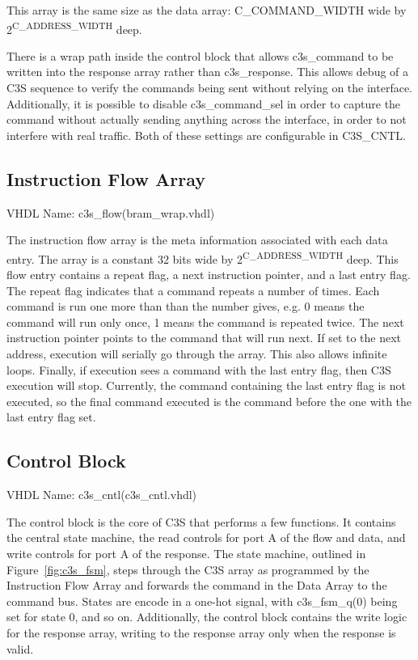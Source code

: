 This array is the same size as the data array: C\_COMMAND\_WIDTH wide
by 2\textsuperscript{C\_ADDRESS\_WIDTH} deep.

There is a wrap path inside the control block that allows c3s\_command
to be written into the response array rather than c3s\_response. This
allows debug of a C3S sequence to verify the commands being sent
without relying on the interface. Additionally, it is possible to
disable c3s\_command\_sel in order to capture the command without
actually sending anything across the interface, in order to not
interfere with real traffic. Both of these settings are configurable
in C3S\_CNTL.

\subsection{Instruction Flow Array}
VHDL Name: c3s\_flow(bram\_wrap.vhdl)

The instruction flow array is the meta information associated with
each data entry. The array is a constant 32 bits wide by
2\textsuperscript{C\_ADDRESS\_WIDTH} deep. This flow entry contains a
repeat flag, a next instruction pointer, and a last entry flag. The
repeat flag indicates that a command repeats a number of times. Each
command is run one more than than the number gives, e.g. 0 means the
command will run only once, 1 means the command is repeated twice. The
next instruction pointer points to the command that will run next. If
set to the next address, execution will serially go through the
array. This also allows infinite loops. Finally, if execution sees a
command with the last entry flag, then C3S execution will
stop. Currently, the command containing the last entry flag is not
executed, so the final command executed is the command before the one
with the last entry flag set.

\subsection{Control Block}
VHDL Name: c3s\_cntl(c3s\_cntl.vhdl)

The control block is the core of C3S that performs a few functions. It
contains the central state machine, the read controls for port A of
the flow and data, and write controls for port A of the response. The
state machine, outlined in Figure~\ref{fig:c3s_fsm}, steps through the
C3S array as programmed by the Instruction Flow Array and forwards the
command in the Data Array to the command bus. States are encode in a
one-hot signal, with c3s\_fsm\_q(0) being set for state 0, and so
on. Additionally, the control block contains the write logic for the
response array, writing to the response array only when the response
is valid.

